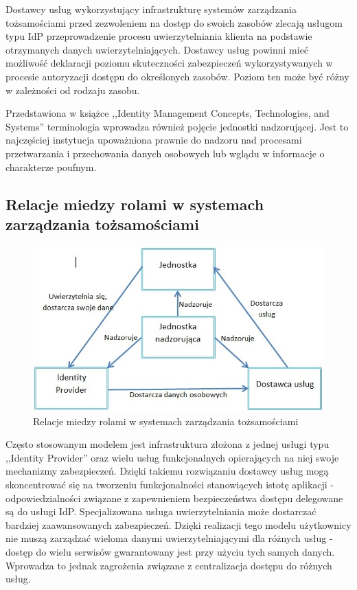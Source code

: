 		Dostawcy usług wykorzystujący infrastrukturę systemów zarządzania tożsamościami przed zezwoleniem na dostęp do swoich zasobów zlecają usługom typu IdP przeprowadzenie procesu uwierzytelniania klienta na podstawie otrzymanych danych uwierzytelniających. Dostawcy usług powinni mieć możliwość deklaracji poziomu skuteczności zabezpieczeń wykorzystywanych w procesie autoryzacji dostępu do określonych zasobów. Poziom ten może być różny w zależności od rodzaju zasobu.

		Przedstawiona w książce ,,Identity Management Concepts, Technologies, and Systems'' terminologia wprowadza również pojęcie jednostki nadzorującej\cite{Bertino11}. Jest to najczęściej instytucja upoważniona prawnie do nadzoru nad procesami przetwarzania i przechowania danych osobowych lub wglądu  w informacje o charakterze poufnym.

	\subsection{Relacje miedzy rolami w systemach zarządzania tożsamościami}

		\begin{figure}[h]
			\centering
			\includegraphics[width=15cm]{img/idmRelations.jpg}
			\caption{Relacje miedzy rolami w systemach zarządzania tożsamościami}
			\label{Relacje miedzy rolami w systemach zarządzania tożsamościami}
		\end{figure}

		Często stosowanym modelem jest infrastruktura złożona z jednej usługi typu ,,Identity Provider'' oraz wielu usług funkcjonalnych opierających na niej swoje mechanizmy zabezpieczeń. Dzięki takiemu rozwiązaniu dostawcy usług mogą skoncentrować się na tworzeniu funkcjonalności stanowiących istotę aplikacji - odpowiedzialności związane z zapewnieniem bezpieczeństwa dostępu delegowane są do usługi IdP. Specjalizowana usługa uwierzytelniania może dostarczać bardziej zaawansowanych zabezpieczeń. Dzięki realizacji tego modelu użytkownicy nie muszą zarządzać wieloma danymi uwierzytelniającymi dla różnych usług - dostęp do wielu serwisów gwarantowany jest przy użyciu tych samych danych. Wprowadza to jednak zagrożenia związane z centralizacja dostępu do różnych usług.

